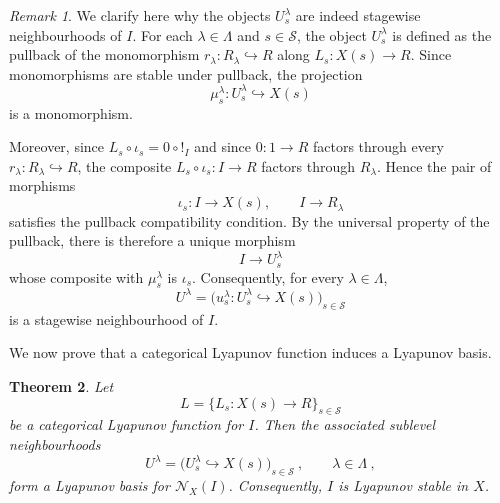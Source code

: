 \documentclass[a4paper,reqno,oneside]{amsart}
\newtheorem{theorem}{Theorem}[section]
\theoremstyle{definition}
\theoremstyle{remark}
\newtheorem{remark}[theorem]{Remark}
\numberwithin{equation}{section}
\begin{document}
\begin{remark}
    We clarify here why the objects $U^\lambda_s$ are indeed stagewise
neighbourhoods of $I$. For each $\lambda\in\Lambda$ and
$s\in\mathcal S$, the object $U^\lambda_s$ is defined as the pullback of the
monomorphism $r_\lambda\colon R_\lambda\hookrightarrow R$ along
$L_s\colon X(s)\to R$. Since monomorphisms are stable under pullback, the
projection
\begin{equation}
    \mu^\lambda_s\colon U^\lambda_s\hookrightarrow X(s)
\end{equation}
is a monomorphism.

Moreover, since $L_s\circ\iota_s=0\circ {!}_I$ and since $0\colon 1\to R$
factors through every $r_\lambda\colon R_\lambda\hookrightarrow R$, the
composite $ L_s\circ\iota_s\colon I\to R$ factors through $R_\lambda$. Hence the pair of morphisms
\begin{equation}
    \iota_s\colon I\to X(s),
    \qquad
    I\to R_\lambda
\end{equation}
satisfies the pullback compatibility condition. By the universal property of
the pullback, there is therefore a unique morphism
\begin{equation}
    I\longrightarrow U^\lambda_s
\end{equation}
whose composite with $\mu_s^\lambda$ is $\iota_s$. Consequently, for every $\lambda \in \Lambda$,
\begin{equation}
    U^\lambda=
    \bigl(u^\lambda_s\colon U^\lambda_s\hookrightarrow X(s)\bigr)_{s\in\mathcal S}
\end{equation}
is a stagewise neighbourhood of $I$.
\end{remark}




We now prove that a categorical Lyapunov function induces a Lyapunov basis.

\begin{theorem}\label{thm: lyapunov function produces Lyapunov basis}
Let
\begin{equation}
    L=\{L_s\colon X(s)\to R\}_{s\in\mathcal S}
\end{equation}
be a categorical Lyapunov function for $I$. Then the associated sublevel
neighbourhoods
\begin{equation}
    U^\lambda=
    \bigl(U^\lambda_s\hookrightarrow X(s)\bigr)_{s\in\mathcal S} \ ,
    \qquad \lambda\in\Lambda \ ,
\end{equation}
form a Lyapunov basis for $\mathcal N_X(I)$. Consequently, $I$ is Lyapunov
stable in $X$.
\end{theorem}
\end{document}
